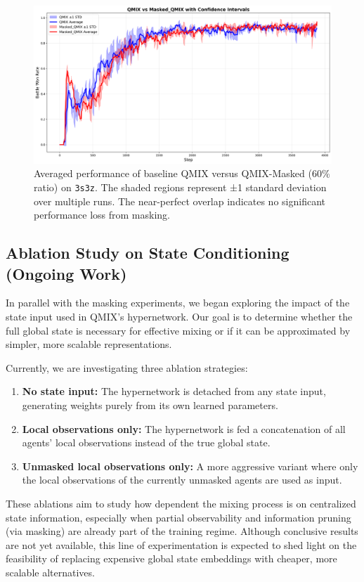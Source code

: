 \documentclass[../Main.tex]{subfiles}
\begin{document}
\begin{figure}[H]
    \centering
    \includegraphics[width=0.7\linewidth]{img/results-analysis/qmix_vs_masked_qmix_with_confidence.png}
    \caption{Averaged performance of baseline QMIX versus QMIX-Masked (60\% ratio) on \texttt{3s3z}. The shaded regions represent ±1 standard deviation over multiple runs. The near-perfect overlap indicates no significant performance loss from masking.}
    \label{fig:confidence_comparison}
\end{figure}


\subsection{Ablation Study on State Conditioning (Ongoing Work)}
In parallel with the masking experiments, we began exploring the impact of the state input used in QMIX’s hypernetwork. Our goal is to determine whether the full global state is necessary for effective mixing or if it can be approximated by simpler, more scalable representations.

Currently, we are investigating three ablation strategies:
\begin{enumerate}
    \item \textbf{No state input:} The hypernetwork is detached from any state input, generating weights purely from its own learned parameters.
    \item \textbf{Local observations only:} The hypernetwork is fed a concatenation of all agents’ local observations instead of the true global state.
    \item \textbf{Unmasked local observations only:} A more aggressive variant where only the local observations of the currently unmasked agents are used as input.
\end{enumerate}

These ablations aim to study how dependent the mixing process is on centralized state information, especially when partial observability and information pruning (via masking) are already part of the training regime. Although conclusive results are not yet available, this line of experimentation is expected to shed light on the feasibility of replacing expensive global state embeddings with cheaper, more scalable alternatives.
\end{document}
